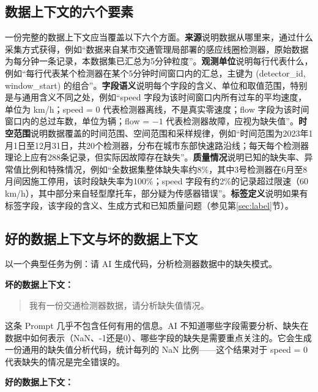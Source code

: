 \subsection{数据上下文的六个要素}

一份完整的数据上下文应当覆盖以下六个方面。\textbf{来源}说明数据从哪里来，通过什么采集方式获得，例如“数据来自某市交通管理局部署的感应线圈检测器，原始数据为每分钟一条记录，本数据集已汇总为5分钟粒度”。\textbf{观测单位}说明每行代表什么，例如“每行代表某个检测器在某个5分钟时间窗口内的汇总，主键为 (detector\_id, window\_start) 的组合”。\textbf{字段语义}说明每个字段的含义、单位和取值范围，特别是与通用含义不同之处，例如“speed 字段为该时间窗口内所有过车的平均速度，单位为 km/h；speed = 0 代表检测器离线，不是真实零速度；flow 字段为该时间窗口内的总过车数，单位为辆；flow = $-1$ 代表检测器故障，应视为缺失值”。\textbf{时空范围}说明数据覆盖的时间范围、空间范围和采样规律，例如“时间范围为2023年1月1日至12月31日，共20个检测器，分布在城市东部快速路沿线；每天每个检测器理论上应有288条记录，但实际因故障存在缺失”。\textbf{质量情况}说明已知的缺失率、异常值比例和特殊情况，例如“全数据集整体缺失率约8\%，其中3号检测器在6月至8月间因施工停用，该时段缺失率为100\%；speed 字段有约2\%的记录超过限速（60 km/h），其中部分来自轻型摩托车，部分疑为传感器错误”。\textbf{标签定义}说明如果有标签字段，该字段的含义、生成方式和已知质量问题（参见第\ref{sec:label}节）。

\subsection{好的数据上下文与坏的数据上下文}

以一个典型任务为例：请 AI 生成代码，分析检测器数据中的缺失模式。

\textbf{坏的数据上下文：}

\begin{quote}
我有一份交通检测器数据，请分析缺失值情况。
\end{quote}

这条 Prompt 几乎不包含任何有用的信息。AI 不知道哪些字段需要分析、缺失在数据中如何表示（NaN、-1还是0）、哪些字段的缺失是需要重点关注的。它会生成一份通用的缺失值分析代码，统计每列的 NaN 比例——这个结果对于 speed = 0 代表缺失的情况是完全错误的。

\textbf{好的数据上下文：}

